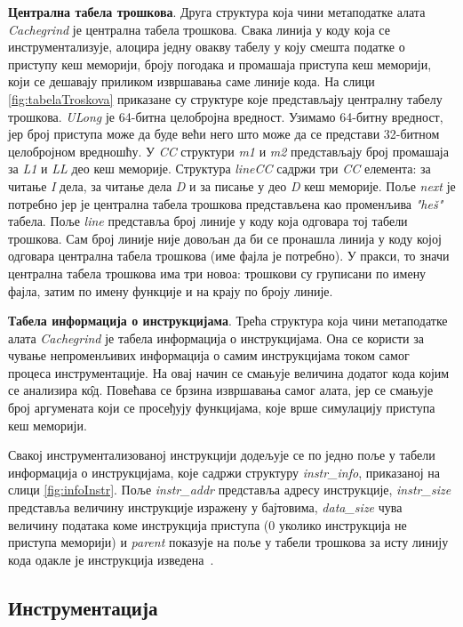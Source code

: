 \documentclass[12pt,oneside]{memoir}
\begin{document}
\indent \textbf{Централна табела трошкова}. Друга структура која чини метаподатке алата \textit{Cachegrind} је централна табела трошкова. Свака линија у коду која се инструментализује, алоцира једну овакву табелу у коју смешта податке о приступу кеш меморији, броју погодака и промашаја приступа кеш меморији, који се дешавају приликом извршавања саме линије кода. На слици \ref{fig:tabelaTroskova} приказане су структуре које представљају централну табелу трошкова. \textit{ULong} је 64-битна целобројна вредност. Узимамо 64-битну вредност, јер број приступа може да буде већи него што може да се представи 32-битном целобројном вредношћу. У \textit{CC} структури \textit{m1} и \textit{m2} представљају број промашаја за \textit{L1} и \textit{LL} део кеш меморије. Структура \textit{lineCC} садржи три \textit{CC} елемента: за читање \textit{I} дела, за читање дела \textit{D} и за писање у део \textit{D} кеш меморије. Поље \textit{next} је потребно јер је централна табела трошкова представљена као променљива \textit{"heš"} табела. Поље \textit{line} представља број линије у коду која одговара тој табели трошкова. Сам број линије није довољан да би се пронашла линија у коду којој одговара централна табела трошкова (име фајла је потребно). У пракси, то значи централна табела трошкова има три новоа: трошкови су груписани по имену фајла, затим по имену функције и на крају по броју линије.


\indent \textbf{Табела информација о инструкцијама}. Трећа структура која чини метаподатке алата \textit{Cachegrind} је табела информација о инструкцијама. Она се користи за чување непроменљивих информација о самим инструкцијама током самог процеса инструментације. На овај начин се смањује величина додатог кода којим се анализира к\^{о}д. Повећава се брзина извршавања самог алата, јер се смањује број аргумената који се просеђују функцијама, које врше симулацију приступа кеш меморији.


\indent Свакој инструментализованој инструкцији додељује се по једно поље у табели информација о инструкцијама, које садржи структуру \textit{instr\_info}, приказаној на слици \ref{fig:infoInstr}. Поље \textit{instr\_addr} представља адресу инструкције,  \textit{instr\_size} представља величину инструкције изражену у бајтовима, \textit{data\_size} чува величину података коме инструкција приступа (0 уколико инструкција не приступа меморији) и \textit{parent} показује на поље у табели трошкова за исту линију кода одакле је инструкција изведена~\cite{cachegrindRef}.

\subsection{Инструментација}
\end{document}
